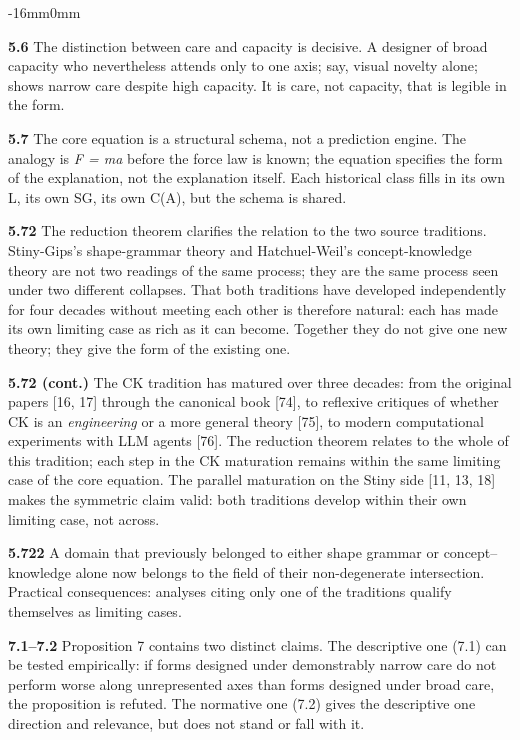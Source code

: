 \documentclass[10pt,oneside]{book}
\newcommand{\msym}[1]{{\mathfbfont #1}}
\newenvironment{widebody}{%
  \begin{adjustwidth}{-16mm}{0mm}%
}{%
  \end{adjustwidth}%
}
\begin{document}
\begin{widebody}
{\textbf{5.6} The distinction between care and capacity is decisive. A designer of broad capacity who nevertheless attends only to one axis; say, visual novelty alone; shows narrow care despite high capacity. It is care, not capacity, that is legible in the form.

\textbf{5.7} The core equation is a structural schema, not a prediction engine. The analogy is \textit{F = ma} before the force law is known; the equation specifies the form of the explanation, not the explanation itself. Each historical class fills in its own \msym{L}, its own SG, its own C(A), but the schema is shared.

\textbf{5.72} The reduction theorem clarifies the relation to the two source traditions. Stiny-Gips's shape-grammar theory and Hatchuel-Weil's concept-knowledge theory are not two readings of the same process; they are the same process seen under two different collapses. That both traditions have developed independently for four decades without meeting each other is therefore natural: each has made its own limiting case as rich as it can become. Together they do not give one new theory; they give the form of the existing one.

\textbf{5.72 (cont.)} The CK tradition has matured over three decades: from the original papers [16, 17] through the canonical book [74], to reflexive critiques of whether CK is an \textit{engineering} or a more general theory [75], to modern computational experiments with LLM agents [76]. The reduction theorem relates to the whole of this tradition; each step in the CK maturation remains within the same limiting case of the core equation. The parallel maturation on the Stiny side [11, 13, 18] makes the symmetric claim valid: both traditions develop within their own limiting case, not across.

\textbf{5.722} A domain that previously belonged to either shape grammar or concept--knowledge alone now belongs to the field of their non-degenerate intersection. Practical consequences: analyses citing only one of the traditions qualify themselves as limiting cases.

\textbf{7.1--7.2} Proposition 7 contains two distinct claims. The descriptive one (7.1) can be tested empirically: if forms designed under demonstrably narrow care do not perform worse along unrepresented axes than forms designed under broad care, the proposition is refuted. The normative one (7.2) gives the descriptive one direction and relevance, but does not stand or fall with it.

}
\end{widebody}
\end{document}

